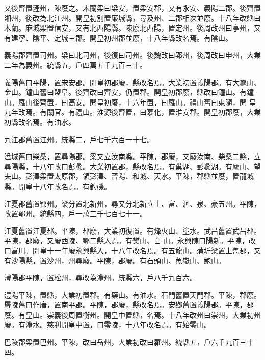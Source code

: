 \begin{pinyinscope}
 又後齊置滻州，陳廢之。木蘭梁曰梁安，置梁安郡，又有永安、義陽二郡。後齊置湘州，後改為北江州。開皇初別置廉城縣，尋及州、二郡相次並廢。十八年改縣曰木蘭。麻城梁置信安，又有北西陽縣。陳廢北西陽，置定州。後周改州曰亭州，又有建寧、陰平、定城三郡。開皇初州郡並廢，十八年縣改名焉。有陰山。



 義陽郡齊置司州。梁曰北司州，後復曰司州。後魏改曰郢州，後周改曰申州，大業二年為義州。統縣五，戶四萬五千九百三十。



 義陽舊曰平陽，置宋安郡。開皇初郡廢，縣改名焉。大業初置義陽郡。有大龜山、金山。鐘山舊曰盟阜。後齊改曰齊安，仍置郡。開皇初郡廢，縣改曰鐘山。有鐘山。羅山後齊置，曰高安。開皇初廢，十六年置，曰羅山。禮山舊曰東隨，開
 皇九年改焉。有關官。有禮山。淮源後齊置，曰慕化，置淮安郡。開皇初郡廢，大業初縣改名焉。有油水。



 九江郡舊置江州。統縣二，戶七千六百一十七。



 湓城舊曰柴桑，置尋陽郡。梁又立汝南縣。平陳，郡廢，又廢汝南、柴桑二縣，立尋陽縣，十八年改曰彭蠡。大業初置郡，縣改名焉。有巢湖、彭蠡湖。有廬山、望夫山。彭澤梁置太原郡，領彭澤、晉陽、和城、天水。平陳，郡縣並廢，置龍城縣。開皇十八年改名焉。有釣磯。



 江夏郡舊置郢州。梁分置北新州，尋又分北新立土、富、洄、泉、豪五州。平陳，改置鄂州。統縣四，戶一萬三千七百七十一。



 江夏舊置江夏郡。平陳，郡廢，大業初復置。有烽火山、塗水。武昌舊置武昌郡。平陳，郡廢，又廢西陵、鄂二縣入焉。有樊山、白山。永興陳曰陽新。平陳，改曰富川。開皇十一年廢永興縣入，十八年改名焉。有五龍山。蒲圻梁置上雋郡，又有沙陽縣，置沙州，州尋廢。平陳，郡廢。有石頭山、魚嶽山、鮑山。



 澧陽郡平陳，置松州，尋改為澧州。統縣六，戶八千九百六。



 澧陽平陳，置縣，大業初置郡。有藥山。有油水。石門舊置天門郡。平陳，郡廢。孱陵舊曰作唐，置南平郡。平陳，郡廢，縣改名焉。安鄉舊置義陽郡。平陳，郡廢。有皇山。崇義後周置衡州。開皇中置縣，名焉。十八年改州曰崇州，大業初州廢。有澧水。慈利開皇中置，曰零陵，十八年改名焉。有始零山。



 巴陵郡梁置巴州。平陳，改曰岳州，大業初改曰羅州。統縣五，戶六千九百三十四。




\end{pinyinscope}
